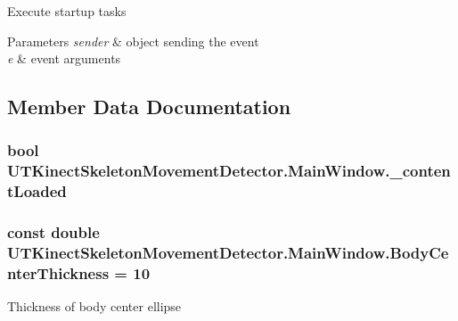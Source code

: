 Execute startup tasks 


\begin{DoxyParams}{Parameters}
{\em sender} & object sending the event\\
\hline
{\em e} & event arguments\\
\hline
\end{DoxyParams}


\subsection{Member Data Documentation}
\hypertarget{classUTKinectSkeletonMovementDetector_1_1MainWindow_ad0b36121811c03d7419565086eef94b4}{
\subsubsection[{\-\_\-content\-Loaded}]{\setlength{\rightskip}{0pt plus 5cm}bool U\-T\-Kinect\-Skeleton\-Movement\-Detector.\-Main\-Window.\-\_\-content\-Loaded\hspace{0.3cm}{\ttfamily [private]}}}\label{classUTKinectSkeletonMovementDetector_1_1MainWindow_ad0b36121811c03d7419565086eef94b4}
\hypertarget{classUTKinectSkeletonMovementDetector_1_1MainWindow_a4f6e1744c877ad860f7ee45ba26b87b8}{
\subsubsection[{Body\-Center\-Thickness}]{\setlength{\rightskip}{0pt plus 5cm}const double U\-T\-Kinect\-Skeleton\-Movement\-Detector.\-Main\-Window.\-Body\-Center\-Thickness = 10\hspace{0.3cm}{\ttfamily [private]}}}\label{classUTKinectSkeletonMovementDetector_1_1MainWindow_a4f6e1744c877ad860f7ee45ba26b87b8}


Thickness of body center ellipse 

